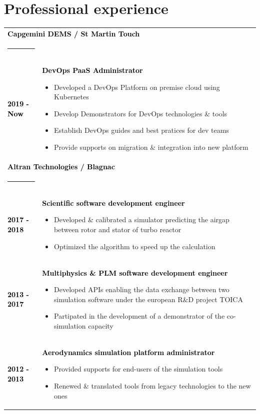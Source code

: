 \documentclass[10pt,A4]{article}
\begin{document}
\begin{minipage}[c]{0.7\textwidth}
\section*{\hspace{0.5cm}Professional experience}
%
\begin{tabular}{p{2cm}p{11cm}}
\multicolumn{2}{l}{\textcolor{black}{\bf Capgemini DEMS / St Martin Touch}}\\
\noindent\textcolor{blue}{\rule{\textwidth}{.8mm}}\\
%
\textcolor{black}{\bf 2019 - Now} & \textcolor{black}{\bf DevOps PaaS Administrator}
\begin{itemize}
  \item \small Developed a DevOps Platform on premise cloud using Kubernetes
  \item \small Develop Demonstrators for DevOps technologies \& tools   
  \item \small Establish DevOps guides and best pratices for dev teams
  \item \small Provide supports on migration \& integration into new platform
\end{itemize}\\
%
\multicolumn{2}{l}{\textcolor{black}{\bf Altran Technologies / Blagnac}}\\
\noindent\textcolor{blue}{\rule{\textwidth}{.8mm}}\\
%
\textcolor{black}{\bf 2017 - 2018} & \textcolor{black}{\bf Scientific software development engineer}
\begin{itemize}
  \item \small Developed \& calibrated a simulator predicting the airgap between rotor and stator of turbo reactor
  \item \small Optimized the algorithm to speed up the calculation
\end{itemize}\\
%
\textcolor{black}{\bf 2013 - 2017} & \textcolor{black}{\bf Multiphysics \& PLM software development engineer}
\begin{itemize}
  \item \small Developed APIs enabling the data exchange between two simulation software under the european R\&D project TOICA
  \item \small Partipated in the development of a demonstrator of the co-simulation capacity
\end{itemize}\\
%
\textcolor{black}{\bf 2012 - 2013} & \textcolor{black}{\bf Aerodynamics simulation platform administrator}
\begin{itemize}
  \item \small Provided supports for end-users of the simulation tools
  \item \small Renewed \& translated tools from legacy technologies to the new ones
\end{itemize}
%
\end{tabular}
%
\vspace*{-8mm}

\end{minipage}
\end{document}
